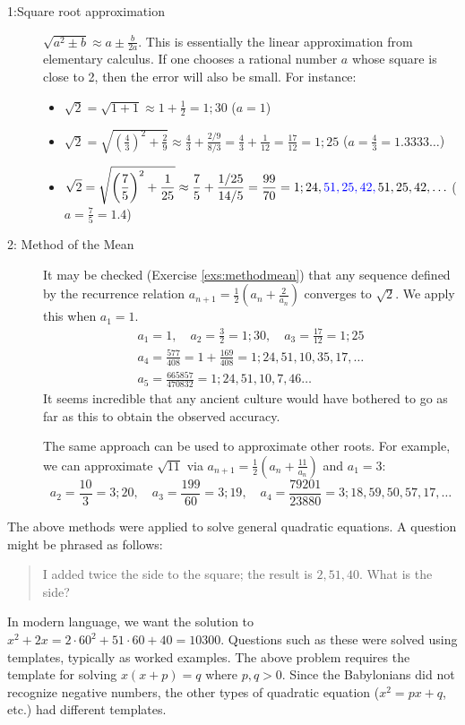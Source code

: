 \begin{description}\label{babroot}
	\item[1:\lstsp Square root approximation] $\sqrt{a^2\pm b}\approx a\pm\frac b{2a}$. This is essentially the linear approximation from elementary calculus. If one chooses a rational number $a$ whose square is close to 2, then the error will also be small. For instance:
	\begin{itemize}\itemsep6pt
  	\item $\displaystyle\sqrt 2=\sqrt{1+1}\approx 1+\frac 12=1;30$ \hfill($a=1$)
  	\item $\displaystyle\sqrt 2=\sqrt{\left(\frac 43\right)^2+\frac 29}\approx\frac 43+\frac{2/9}{8/3}=\frac 43+\frac 1{12}=\frac{17}{12}=1;25$ \hfill($a=\frac 43=1.3333\ldots$)
  	\item $\displaystyle\sqrt 2=\sqrt{\left(\frac 75\right)^2+\frac 1{25}}\approx \frac 75+\frac{1/25}{14/5}=\frac{99}{70}=1;24,\textcolor{blue}{51,25,42,}\,51,25,42,\ldots$ \hfill($a=\frac 75=1.4$)
	\end{itemize}
	
	\item[2: Method of the Mean]\label{methodmean} It may be checked (Exercise \ref{exs:methodmean}) that any sequence defined by the recurrence relation $a_{n+1}=\frac 12\left(a_n+\frac 2{a_n}\right)$ converges to $\sqrt 2$. We apply this when $a_1=1$.
	\begin{gather*}
		a_1=1,\quad a_2=\frac 32=1;30,\quad a_3=\frac{17}{12}=1;25\\[6pt]
		a_4=\frac{577}{408}=1+\frac{169}{408}=1;24,51,10,35,17,\ldots\\[6pt]
		a_5=\frac{665857}{470832}=1;24,51,10,7,46\ldots
	\end{gather*}
	It seems incredible that any ancient culture would have bothered to go as far as this to obtain the observed accuracy.\smallbreak

	The same approach can be used to approximate other roots. For example, we can approximate $\sqrt{11}$ via $a_{n+1}=\frac 12(a_n+\frac{11}{a_n})$ and $a_1=3$:
	\[
		a_2=\frac{10}3=3;20,\quad a_3=\frac{199}{60}=3;19,\quad a_4=\frac{79201}{23880}=3;18,59,50,57,17,\ldots
	\]
\end{description}




The above methods were applied to solve general quadratic equations. A question might be phrased as follows:
\begin{quote}
	I added twice the side to the square; the result is $2,51,40$. What is the side?
\end{quote}
In modern language, we want the solution to $x^2+2x=2\cdot 60^2+51\cdot 60+40=10300$.\smallbreak
Questions such as these were solved using templates, typically as worked examples. The above problem requires the template for solving $x(x+p)=q$ where $p,q>0$. Since the Babylonians did not recognize negative numbers, the other types of quadratic equation ($x^2=px+q$, etc.) had different templates.\goodbreak

